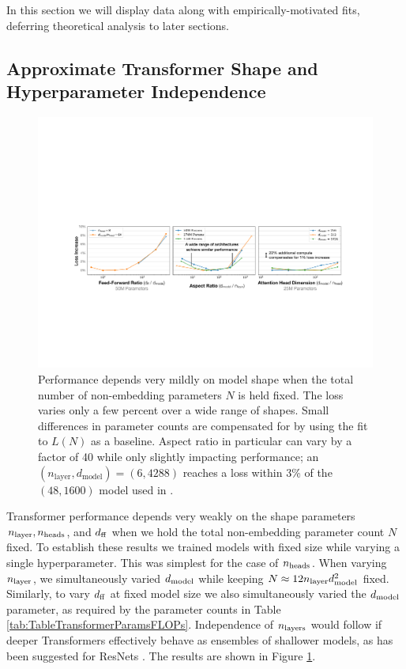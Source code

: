 \documentclass[english]{article}
\begin{document}
In this section we will display data along with empirically-motivated fits, deferring theoretical analysis to later sections.  

\subsection{Approximate Transformer Shape and Hyperparameter Independence}
\label{sec:ShapeIndependence}

\begin{figure}
\noindent \centering{} 
\includegraphics[width=\textwidth]{HyperparameterTuning}
 \caption[Weak dependence of performance on hyperparameter tuning]{Performance depends very mildly on model shape when the total number of non-embedding parameters $N$ is held fixed.  The loss varies only a few percent over a wide range of shapes.  Small differences in parameter counts are compensated for by using the fit to $L(N)$ as a baseline.  Aspect ratio in particular can vary by a factor of 40 while only slightly impacting performance; an $(n_{\mathrm{layer}}, d_{\mathrm{model}}) = (6, 4288)$ reaches a loss within 3\% of the $(48, 1600)$ model used in \cite{radford2019language}.  \label{fig:HeadsLayersIndependence}}
\end{figure}

Transformer performance depends very weakly on the shape parameters $n_{\rm layer}, n_{\rm heads}$, and $d_{\rm ff}$ when we hold the total non-embedding parameter count $N$ fixed.  
To establish these results we  trained models with fixed size while varying a single hyperparameter. This was simplest for the case of $n_{\rm heads}$.  When varying $n_{\rm layer}$, we simultaneously varied $d_{{\rm model}}$ while keeping $N \approx 12 n_{\rm layer} d_{{\rm model}}^2$ fixed.  Similarly, to vary $d_{\rm ff}$ at fixed model size we also simultaneously varied the $d_{{\rm model}}$ parameter, as required by the parameter counts in Table \ref{tab:TableTransformerParamsFLOPs}.  Independence of $n_{\rm layers}$ would follow if deeper Transformers effectively behave as ensembles of shallower models, as has been suggested for ResNets \cite{ResNetsEnsemblesShallow}.  The results are shown in Figure \ref{fig:HeadsLayersIndependence}.
\end{document}
